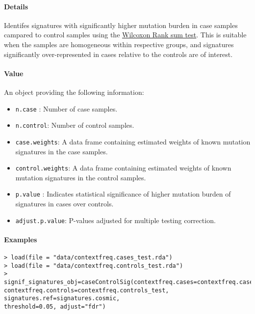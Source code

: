 \documentclass[]{article}
\providecommand{\tightlist}{%
  \setlength{\itemsep}{0pt}\setlength{\parskip}{0pt}}
\let\oldparagraph\paragraph
\renewcommand{\paragraph}[1]{\oldparagraph{#1}\mbox{}}
\begin{document}
\paragraph{\texorpdfstring{\textbf{Details}}{Details}}\label{details-9}

Identifes signatures with significantly higher mutation burden in case
samples campared to control samples using the
\href{https://www.rdocumentation.org/packages/stats/versions/3.5.2/topics/wilcox.test}{Wilcoxon
Rank sum test}. This is suitable when the samples are homogeneous within
respective groups, and signatures significantly over-represented in
cases relative to the controls are of interest.

\paragraph{\texorpdfstring{\textbf{Value}}{Value}}\label{value-11}

An object providing the following information:

\begin{itemize}
\tightlist
\item
  \texttt{n.case} : Number of case samples.
\item
  \texttt{n.control}: Number of control samples.
\item
  \texttt{case.weights}: A data frame containing estimated weights of
  known mutation signatures in the case samples.
\item
  \texttt{control.weights}: A data frame containing estimated weights of
  known mutation signatures in the control samples.
\item
  \texttt{p.value} : Indicates statistical significance of higher
  mutation burden of signatures in cases over controls.
\item
  \texttt{adjust.p.value}: P-values adjusted for multiple testing
  correction.
\end{itemize}

\paragraph{\texorpdfstring{\textbf{Examples}}{Examples}}\label{examples-13}

\begin{verbatim}
> load(file = "data/contextfreq.cases_test.rda")
> load(file = "data/contextfreq.controls_test.rda")
> signif_signatures_obj=caseControlSig(contextfreq.cases=contextfreq.cases_test, 
contextfreq.controls=contextfreq.controls_test, signatures.ref=signatures.cosmic, 
threshold=0.05, adjust="fdr")

\end{verbatim}



\printindex
\end{document}
